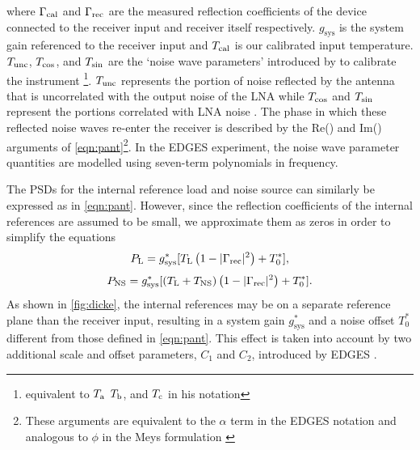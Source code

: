 where $\Gamma_{\mathrm{cal}}$ and $\Gamma_{\mathrm{rec}}$ are the measured reflection coefficients of the device connected to the receiver input and receiver itself respectively. $g_{\mathrm{sys}}$ is the system gain referenced to the receiver input and $T_{\mathrm{cal}}$ is our calibrated input temperature. $T_{\mathrm{unc}}$, $T_{\mathrm{cos}}$, and $T_{\mathrm{sin}}$ are the ‘noise wave parameters’ introduced by \citet{meys} to calibrate the instrument \footnote{equivalent to $T_{\mathrm{a}}$ $T_{\mathrm{b}}$, and $T_{\mathrm{c}}$ in his notation}. $T_{\mathrm{unc}}$ represents the portion of noise reflected by the antenna that is uncorrelated with the output noise of the LNA while $T_{\mathrm{cos}}$ and $T_{\mathrm{sin}}$ represent the portions correlated with LNA noise \citep{edgesCal, rogersCal}. The phase in which these reflected noise waves re-enter the receiver is described by the Re() and Im() arguments of \cref{eqn:pant}\footnote{These arguments are equivalent to the $\alpha$ term in the EDGES notation \cite{edgesCal} and analogous to $\phi$ in the Meys formulation \citep{meys}}. In the EDGES experiment, the noise wave parameter quantities are modelled using seven-term polynomials in frequency.

The PSDs for the internal reference load and noise source can similarly be expressed as in \cref{eqn:pant}. However, since the reflection coefficients of the internal references are assumed to be small, we approximate them as zeros in order to simplify the equations
\begin{equation}
  \label{eqn:pl}
  P_{\mathrm{L}} = g_{\mathrm{sys}}^*[T_{\mathrm{L}}\left(1-|\Gamma_{\mathrm{rec}}|^2\right)+T_{0}^*],
\end{equation}
\begin{equation}
  \label{eqn:pns}
  P_{\mathrm{NS}} = g_{\mathrm{sys}}^*[\left(T_{\mathrm{L}}+T_{\mathrm{NS}}\right)\left(1-|\Gamma_{\mathrm{rec}}|^2\right)+T_{0}^*].
\end{equation}
As shown in \cref{fig:dicke}, the internal references may be on a separate reference plane than the receiver input, resulting in a system gain $g_{\mathrm{sys}}^*$ and a noise offset $T_{0}^*$ different from those defined in \cref{eqn:pant}. This effect is taken into account by two additional scale and offset parameters, $C_1$ and $C_2$, introduced by EDGES \citep{edgesCal}.

